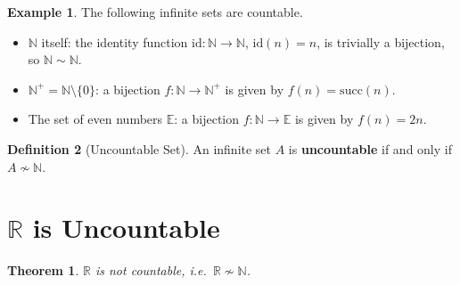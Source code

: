 \documentclass[12pt]{article}
\theoremstyle{definition}
\newtheorem{definition}{Definition}[section]
\newtheorem{example}[definition]{Example}
\theoremstyle{plain}
\newtheorem{theorem}{Theorem}[section]
\theoremstyle{remark}
\newcommand{\N}{\mathbb{N}}
\newcommand{\R}{\mathbb{R}}
\begin{document}
\begin{example}
The following infinite sets are countable.
\begin{itemize}[nosep]
    \item $\N$ itself: the identity function $\mathrm{id}\colon \N \to \N$, $\mathrm{id}(n)=n$,
          is trivially a bijection, so $\N \sim \N$.
    \item $\N^{+} = \N \setminus \{0\}$: a bijection $f\colon \N \to \N^{+}$ is given by
          $f(n)=\mathrm{succ}(n)$.
    \item The set of even numbers $\mathbb{E}$: a bijection $f\colon \N \to \mathbb{E}$ is given by
          $f(n)=2n$.
\end{itemize}
\end{example}

\begin{definition}[Uncountable Set]
An infinite set $A$ is \textbf{uncountable} if and only if $A \not\sim \N$.
\end{definition}

\section{\texorpdfstring{$\R$}{R} is Uncountable}

\begin{theorem}
$\R$ is not countable, i.e.\ $\R \not\sim \N$.
\end{theorem}
\end{document}
